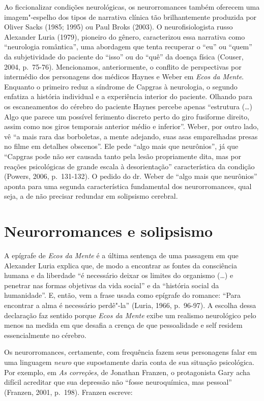 Ao ficcionalizar condições neurológicas, os neurorromances também
oferecem uma imagem"-espelho dos tipos de narrativa clínica tão
brilhantemente produzida por Oliver Sacks (1985; 1995) ou Paul Broks
(2003). O neurofisiologista russo Alexander Luria (1979), pioneiro do
gênero, caracterizou essa narrativa como ``neurologia romântica'', uma
abordagem que tenta recuperar o ``eu'' ou ``quem'' da subjetividade do
paciente do ``isso'' ou do ``quê'' da doença física (Couser, 2004,
p.~75-76). Mencionamos, anteriormente, o conflito de perspectivas por
intermédio dos personagens dos médicos Haynes e Weber em \emph{Ecos da
Mente}. Enquanto o primeiro reduz a síndrome de Capgras à neurologia, o
segundo enfatiza a história individual e a experiência interior do
paciente. Olhando para os escaneamentos do cérebro do paciente Haynes
percebe apenas ``estrutura (\ldots{}) Algo que parece um possível ferimento
discreto perto do giro fusiforme direito, assim como nos giros temporais
anterior médio e inferior''. Weber, por outro lado, vê ``a mais rara das
borboletas, a mente adejando, suas asas emparelhadas presas no filme em
detalhes obscenos''. Ele pede ``algo mais que neurônios'', já que
``Capgras pode não ser causada tanto pela lesão propriamente dita, mas
por reações psicológicas de grande escala à desorientação''
característica da condição (Powers, 2006, p.~131-132). O pedido do dr.
Weber de ``algo mais que neurônios'' aponta para uma segunda
característica fundamental dos neurorromances, qual seja, a de não
precisar redundar em solipsismo cerebral.

\section{Neurorromances e solipsismo}

A epígrafe de \emph{Ecos da Mente} é a última sentença de uma passagem
em que Alexander Luria explica que, de modo a encontrar as fontes da
consciência humana e da liberdade ``é necessário deixar os limites do
organismo (\ldots{}) e penetrar nas formas objetivas da vida social'' e da
``história social da humanidade''. E, então, vem a frase usada como
epígrafe do romance: ``Para encontrar a alma é necessário perdê"-la''
(Luria, 1966, p.~96-97). A escolha dessa declaração faz sentido porque
\emph{Ecos da Mente} exibe um realismo neurológico pelo menos na medida
em que desafia a crença de que pessoalidade e self residem
essencialmente no cérebro.

Os neurorromances, certamente, com frequência fazem seus personagens
falar em uma linguagem \emph{neuro} que supostamente daria conta de sua
situação psicológica. Por exemplo, em \emph{As correções}, de Jonathan
Franzen, o protagonista Gary acha difícil acreditar que sua depressão
não ``fosse neuroquímica, mas pessoal'' (Franzen, 2001, p.~198). Franzen
escreve:

